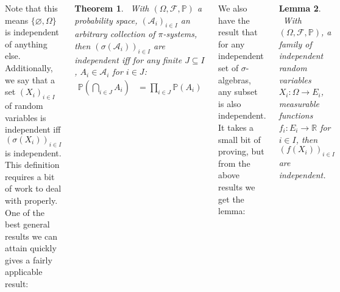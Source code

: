 \documentclass{tikzposter} %
\newtheorem{theorem}{Theorem}
\newtheorem{lemma}[theorem]{Lemma}
\newtheorem{definition}{Definition}
\begin{document}
\begin{columns}
{    Note that this means $\{\varnothing, \Omega\}$ is independent of anything else. \\

    Additionally, we say that a set $(X_{i})_{i \in I}$ of random variables is independent iff $(\sigma(X_{i}))_{i \in I}$ is independent. \\

    This definition requires a bit of work to deal with properly. One of the best general results we can attain quickly gives a fairly applicable result:
    \begin{theorem}
    \ With $(\Omega, \mathcal{F}, \mathbb{P})$ a probability space, $(\mathcal{A}_{i})_{i \in I}$ an arbitrary collection of $\pi$-systems, then $(\sigma(\mathcal{A}_{i}))_{i \in I}$ are independent iff for any finite $J \subseteq I$, $A_{i} \in \mathcal{A}_{i}$ for $i \in J$:
    \begin{align*}
      \mathbb{P}\left(\bigcap_{i \in J} A_{i}\right) &= \prod_{i \in J} \mathbb{P}(A_{i})
    \end{align*}
    \end{theorem}
    \hphantom{}

    We also have the result that for any independent set of $\sigma$-algebras, any subset is also independent. \\

    It takes a small bit of proving, but from the above results we get the lemma:
    \begin{lemma}
    \ With $(\Omega, \mathcal{F}, \mathbb{P})$, a family of independent random variables $X_{i} : \Omega \to E_{i}$, measurable functions $f_{i} : E_{i} \to \mathbb{R}$ for $i \in I$, then $(f(X_{i}))_{i \in I}$ are independent.
    \end{lemma}
    \hphantom{}

    }
\end{columns}
\end{document}
